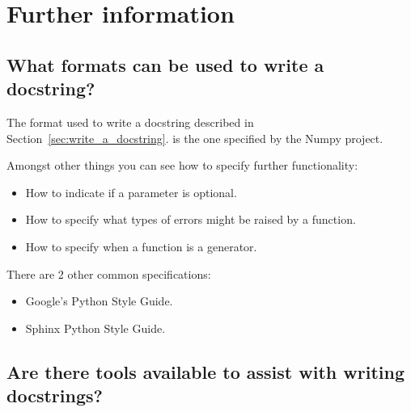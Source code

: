 \section{Further information}
\label{\detokenize{building-tools/02-functions-and-data-structures/why/main:further-information}}\label{\detokenize{building-tools/02-functions-and-data-structures/why/main::doc}}

\subsection{What formats can be used to write a docstring?}
\label{\detokenize{building-tools/02-functions-and-data-structures/why/main:what-formats-can-be-used-to-write-a-docstring}}

The format used to write a docstring described in 
Section~\ref{sec:write_a_docstring}.
is the one specified
by the Numpy project. 


Amongst other things you can see how to specify further functionality:
\begin{itemize}
\item 

How to indicate if a parameter is optional.

\item 

How to specify what types of errors might be raised by a function.

\item 

How to specify when a function is a generator.

\end{itemize}


There are 2 other common specifications:
\begin{itemize}
\item 

Google’s Python Style Guide.

\item 

Sphinx Python Style Guide.

\end{itemize}


\subsection{Are there tools available to assist with writing docstrings?}
\label{\detokenize{building-tools/02-functions-and-data-structures/why/main:are-there-tools-available-to-assist-with-writing-docstrings}}

